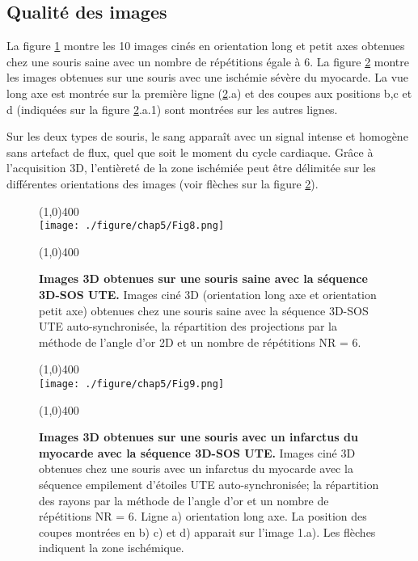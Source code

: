 \newpage
\subsection{Qualité des images}

La figure \ref{fig:ImSaine} montre les 10 images cinés en orientation long et petit axes obtenues chez une souris saine avec un nombre de répétitions égale à 6. La figure \ref{fig:ImInfarct} montre les images obtenues sur une souris avec une ischémie sévère du myocarde. La vue long axe est montrée sur la première ligne (\ref{fig:ImInfarct}.a) et des coupes aux positions b,c et d (indiquées sur la figure \ref{fig:ImInfarct}.a.1) sont montrées sur les autres lignes.

Sur les deux types de souris, le sang apparaît avec un signal intense et homogène sans artefact de flux, quel que soit le moment du cycle cardiaque. Grâce à l'acquisition 3D, l'entièreté de la zone ischémiée peut être délimitée sur les différentes orientations des images (voir flèches sur la figure \ref{fig:ImInfarct}).

\begin{figure}[H]
\centering
\line(1,0){400} \\
\texttt{[image: ./figure/chap5/Fig8.png]}
\caption[Images 3D obtenues sur une souris saine avec la séquence 3D-SOS UTE]{\label{fig:ImSaine} \textbf{Images 3D obtenues sur une souris saine avec la séquence 3D-SOS UTE.} Images ciné 3D (orientation long axe et orientation petit axe) obtenues chez une souris saine avec la séquence 3D-SOS UTE auto-synchronisée, la répartition des projections par la méthode de l’angle d’or 2D et un nombre de répétitions NR = 6.}
\line(1,0){400} \\ 
\end{figure}

\begin{figure}[H]
\centering
\line(1,0){400} \\
\texttt{[image: ./figure/chap5/Fig9.png]}
\caption[Images 3D obtenues sur une souris avec un infarctus du myocarde avec la séquence 3D-SOS UTE.]{\label{fig:ImInfarct} \textbf{Images 3D obtenues sur une souris avec un infarctus du myocarde avec la séquence 3D-SOS UTE.} Images ciné 3D obtenues chez une souris avec un infarctus du myocarde avec la séquence empilement d’étoiles UTE auto-synchronisée; la répartition des rayons par la méthode de l’angle d’or et un nombre de répétitions NR = 6. Ligne a) orientation long axe. La position des coupes montrées en b) c) et d) apparait sur l’image 1.a). Les flèches indiquent la zone ischémique.}
\line(1,0){400} \\ 
\end{figure}


